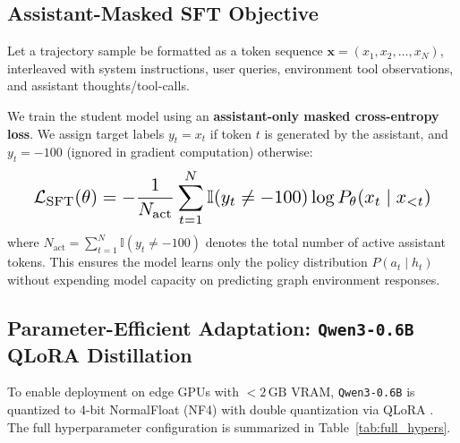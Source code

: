 \documentclass[11pt]{article}
\begin{document}
\subsection{Assistant-Masked SFT Objective}
Let a trajectory sample be formatted as a token sequence $\mathbf{x} = (x_1, x_2, \dots, x_N)$, interleaved with system instructions, user queries, environment tool observations, and assistant thoughts/tool-calls.

We train the student model using an \textbf{assistant-only masked cross-entropy loss}. We assign target labels $y_t = x_t$ if token $t$ is generated by the assistant, and $y_t = -100$ (ignored in gradient computation) otherwise:
\begin{equation}
\label{eq:sft_loss}
\resizebox{0.92\columnwidth}{!}{$
\displaystyle \mathcal{L}_{\text{SFT}}(\theta) = -\frac{1}{N_{\text{act}}} \sum_{t=1}^N \mathbb{I}(y_t \ne -100) \log P_\theta(x_t \mid x_{<t})
$}
\end{equation}
where $N_{\text{act}} = \sum_{t=1}^N \mathbb{I}(y_t \ne -100)$ denotes the total number of active assistant tokens. This ensures the model learns only the policy distribution $P(a_t \mid h_t)$ without expending model capacity on predicting graph environment responses.

\subsection{Parameter-Efficient Adaptation: \texttt{Qwen3-0.6B} QLoRA Distillation}
To enable deployment on edge GPUs with $<2\,\text{GB}$ VRAM, \texttt{Qwen3-0.6B} is quantized to 4-bit NormalFloat (NF4) with double quantization via QLoRA \citep{dettmers2023qlora}. The full hyperparameter configuration is summarized in Table~\ref{tab:full_hypers}.

\begin{table}[t]
\centering
\small
{}
\caption{Hyperparameter configuration for \texttt{Qwen3-0.6B} distillation.}
\label{tab:full_hypers}
\end{table}
\end{document}

